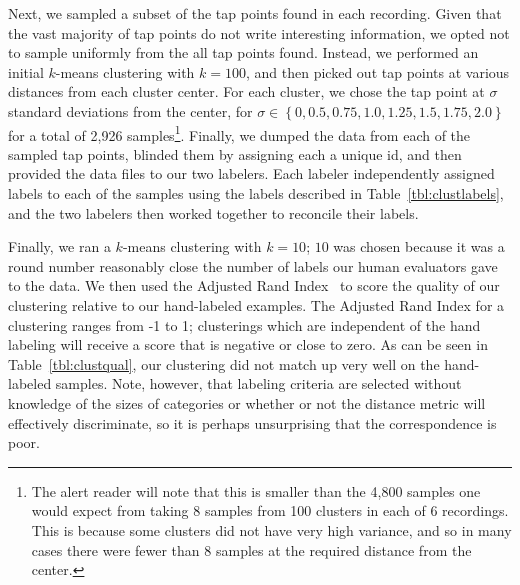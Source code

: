 Next, we sampled a subset of the tap points found in each recording.
Given that the vast majority of tap points do not write interesting
information, we opted not to sample uniformly from the all tap points
found. Instead, we performed an initial $k$-means clustering with $k =
100$, and then picked out tap points at various distances from each
cluster center. For each cluster, we chose the tap point at $\sigma$
standard deviations from the center, for $\sigma \in \left\{0, 0.5,
0.75, 1.0, 1.25, 1.5, 1.75, 2.0 \right\}$ for a total of 2,926
samples\footnote{The alert reader will note that this is smaller than
the 4,800 samples one would expect from taking 8 samples from 100
clusters in each of 6 recordings. This is because some clusters did not
have very high variance, and so in many cases there were fewer than 8
samples at the required distance from the center.}. Finally, we dumped
the data from each of the sampled tap points, blinded them by assigning
each a unique id, and then provided the data files to our two labelers.
Each labeler independently assigned labels to each of the samples using
the labels described in Table~\ref{tbl:clustlabels}, and the two
labelers then worked together to reconcile their labels.  

Finally, we ran a $k$-means clustering with $k = 10$; $10$ was chosen
because it was a round number reasonably close the number of labels our
human evaluators gave to the data. We then used the Adjusted Rand
Index~\cite{Hubert:1985zr} to score the quality of our clustering
relative to our hand-labeled examples. The Adjusted Rand Index for a
clustering ranges from -1 to 1; clusterings which are independent of the
hand labeling will receive a score that is negative or close to zero. As
can be seen in Table~\ref{tbl:clustqual}, our clustering did not match 
up very well on the hand-labeled samples.  Note, however, that labeling
criteria are selected without knowledge of the sizes of categories or
whether or not the distance metric will effectively discriminate, so it
is perhaps unsurprising that the correspondence is poor.

